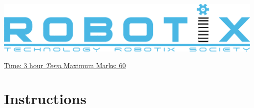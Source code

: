 \documentclass[11pt,paper=a4,answers]{exam}
\begin{document}

\noindent
\begin{minipage}[l]{.1\textwidth}%
\noindent
\centering
\includegraphics[scale={0.25}]{logo.png}
\end{minipage}

\vspace{0.5cm}
\hfill

\begin{minipage}[r]{.68\textwidth}%
\begin{center}

\end{center}
\end{minipage}
\par
\noindent
\uline{Time: 3 hour   \hfill \normalsize\emph{\underline{Term}} \hfill        Maximum Marks: 60}

\section{Instructions}
\end{document}
